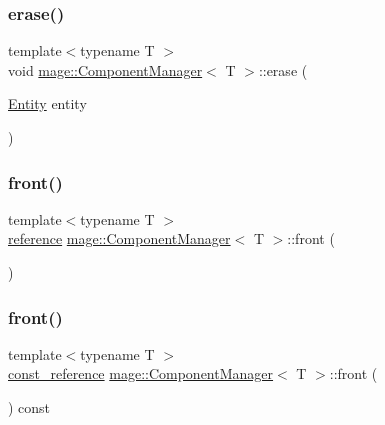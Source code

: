 \subsubsection{\texorpdfstring{erase()}{erase()}}
{\footnotesize\ttfamily template$<$typename T $>$ \\
void \mbox{\hyperlink{classmage_1_1_component_manager}{mage\+::\+Component\+Manager}}$<$ T $>$\+::erase (\begin{DoxyParamCaption}\item[{\mbox{\hyperlink{classmage_1_1_entity}{Entity}}}]{entity }\end{DoxyParamCaption})}

\mbox{\label{classmage_1_1_component_manager_a151bff7fcddb05f821fb7577c052e452}} 
\subsubsection{\texorpdfstring{front()}{front()}\hspace{0.1cm}{\footnotesize\ttfamily [1/2]}}
{\footnotesize\ttfamily template$<$typename T $>$ \\
\mbox{\hyperlink{classmage_1_1_component_manager_a4daeb292f527534c155e359faf7eaf80}{reference}} \mbox{\hyperlink{classmage_1_1_component_manager}{mage\+::\+Component\+Manager}}$<$ T $>$\+::front (\begin{DoxyParamCaption}{ }\end{DoxyParamCaption})\hspace{0.3cm}{\ttfamily [noexcept]}}

\mbox{\label{classmage_1_1_component_manager_a0c72473eb010a2bcd121e27f626f83c5}} 
\subsubsection{\texorpdfstring{front()}{front()}\hspace{0.1cm}{\footnotesize\ttfamily [2/2]}}
{\footnotesize\ttfamily template$<$typename T $>$ \\
\mbox{\hyperlink{classmage_1_1_component_manager_ae1b1c864f0dc2cd35c63e1084971b89c}{const\+\_\+reference}} \mbox{\hyperlink{classmage_1_1_component_manager}{mage\+::\+Component\+Manager}}$<$ T $>$\+::front (\begin{DoxyParamCaption}{ }\end{DoxyParamCaption}) const\hspace{0.3cm}{\ttfamily [noexcept]}}

